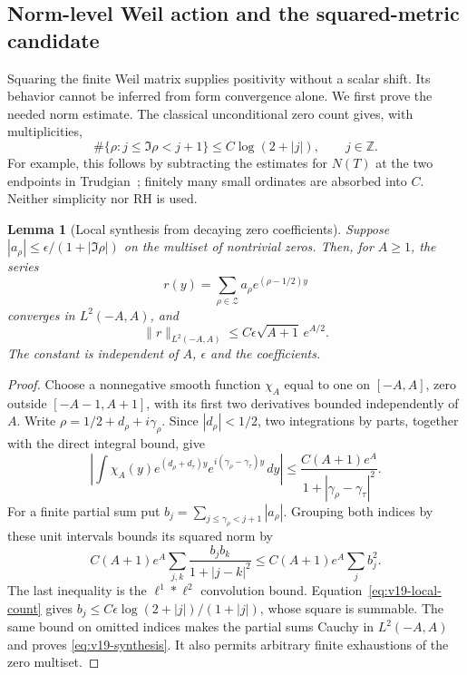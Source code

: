 \documentclass[11pt]{article}
\newtheorem{lemma}[theorem]{Lemma}
\theoremstyle{remark}
\newcommand{\Z}{\mathcal Z}
\begin{document}
\subsection*{Norm-level Weil action and the squared-metric candidate}
Squaring the finite Weil matrix supplies positivity without a scalar
shift. Its behavior cannot be inferred from form convergence alone.
We first prove the needed norm estimate. The classical unconditional
zero count gives, with multiplicities,
\begin{equation}\label{eq:v19-local-count}
 \#\{\rho:j\le\Im\rho<j+1\}\le C\log(2+|j|),\qquad j\in\mathbb Z.
\end{equation}
For example, this follows by subtracting the estimates for $N(T)$ at
the two endpoints in Trudgian~\cite[Corollary 1]{Trudgian2012}; finitely
many small ordinates are absorbed into $C$. Neither simplicity nor RH
is used.

\begin{lemma}[Local synthesis from decaying zero coefficients]
\label{lem:v19-synthesis}
Suppose $|a_\rho|\le\epsilon/(1+|\Im\rho|)$ on the multiset of
nontrivial zeros. Then, for $A\ge1$, the series
\[
 r(y)=\sum_{\rho\in\Z}a_\rho e^{(\rho-1/2)y}
\]
converges in $L^2(-A,A)$, and
\begin{equation}\label{eq:v19-synthesis}
 \|r\|_{L^2(-A,A)}\le C\epsilon\sqrt{A+1}\,e^{A/2}.
\end{equation}
The constant is independent of $A$, $\epsilon$ and the coefficients.
\end{lemma}
\begin{proof}
Choose a nonnegative smooth function $\chi_A$ equal to one on
$[-A,A]$, zero outside $[-A-1,A+1]$, with its first two derivatives
bounded independently of $A$. Write $\rho=1/2+d_\rho+i\gamma_\rho$.
Since $|d_\rho|<1/2$, two integrations by parts, together with the
direct integral bound, give
\[
 \left|\int\chi_A(y)e^{(d_\rho+d_\tau)y}
                  e^{i(\gamma_\rho-\gamma_\tau)y}\,dy\right|
 \le\frac{C(A+1)e^A}{1+|\gamma_\rho-\gamma_\tau|^2}.
\]
For a finite partial sum put
$b_j=\sum_{j\le\gamma_\rho<j+1}|a_\rho|$. Grouping both
indices by these unit intervals bounds its squared norm by
\[
 C(A+1)e^A\sum_{j,k}\frac{b_jb_k}{1+|j-k|^2}
 \le C(A+1)e^A\sum_j b_j^2.
\]
The last inequality is the $\ell^1*\ell^2$ convolution bound.
Equation~\eqref{eq:v19-local-count} gives
$b_j\le C\epsilon\log(2+|j|)/(1+|j|)$, whose square is summable.
The same bound on omitted indices makes the partial sums Cauchy in
$L^2(-A,A)$ and proves \eqref{eq:v19-synthesis}. It also permits
arbitrary finite exhaustions of the zero multiset.
\end{proof}
\end{document}
